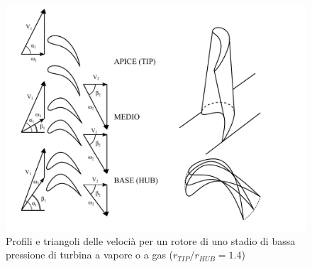 \begin{figure}
\centering
  \includegraphics[width=.8\textwidth]{fig/TurbVortLib.pdf}
\caption{Profili e triangoli delle velocià per un rotore di uno stadio di bassa pressione di turbina a vapore o a gas ($r_{TIP}/r_{HUB} =1.4$)}
\label{fig:TurbVortLib}
\end{figure}



